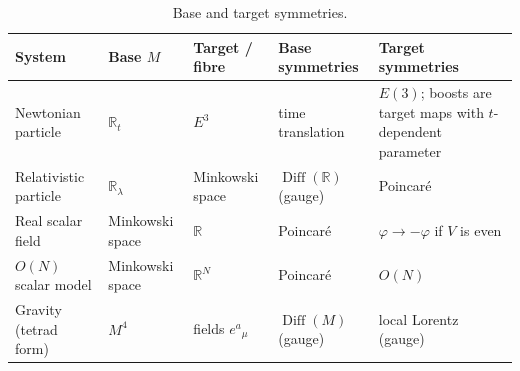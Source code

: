 \documentclass[11pt,a4paper,openany]{book}
\theoremstyle{definition}
\theoremstyle{plain}
\theoremstyle{remark}
\DeclareMathOperator{\Diff}{Diff}
\begin{document}
\begin{table}[ht]
\centering
\footnotesize
\renewcommand{\arraystretch}{1.3}
\setlength{\tabcolsep}{3pt}
\begin{tabular}{@{}>{\raggedright\arraybackslash}p{3.0cm}%
                  >{\raggedright\arraybackslash}p{2.1cm}%
                  >{\raggedright\arraybackslash}p{2.4cm}%
                  >{\raggedright\arraybackslash}p{3.0cm}%
                  >{\raggedright\arraybackslash}p{3.6cm}@{}}
\toprule
System & Base $M$ & Target / fibre & Base symmetries & Target symmetries\\
\midrule
Newtonian particle & $\mathbb R_t$ & $E^3$ & time translation
  & $E(3)$; boosts are target maps with $t$-dependent parameter\\
Relativistic particle & $\mathbb R_\lambda$ & Minkowski space
  & $\Diff(\mathbb R)$ (gauge) & Poincar\'e\\
Real scalar field & Minkowski space & $\mathbb R$ & Poincar\'e
  & $\varphi\to-\varphi$ if $V$ is even\\
$O(N)$ scalar model & Minkowski space & $\mathbb R^N$ & Poincar\'e & $O(N)$\\
Gravity (tetrad form) & $M^4$ & fields $e^a{}_\mu$ & $\Diff(M)$ (gauge)
  & local Lorentz (gauge)\\
\bottomrule
\end{tabular}
\caption{Base and target symmetries.}
\label{tab:base-target}
\end{table}
\end{document}
